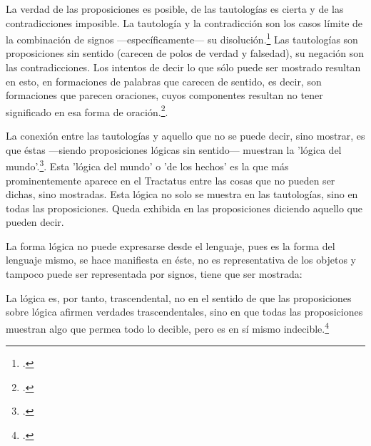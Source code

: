 
    La verdad de las proposiciones es posible, de las tautologías es cierta y de las
    contradicciones imposible. La tautología y la contradicción son los casos límite
    de la combinación de signos ---específicamente--- su
    disolución.\footcite[cf.~][4.464 y 4.466]{tractatus} Las tautologías son
    proposiciones sin sentido (carecen de polos de verdad y falsedad), su negación son
    las contradicciones. Los intentos de decir lo que sólo puede ser mostrado
    resultan en esto, en formaciones de palabras que carecen de sentido, es decir,
    son formaciones que parecen oraciones, cuyos componentes resultan no tener
    significado en esa forma de oración.\footcite[cf.~][p.~163~\S2]{IWT}.

La conexión entre las tautologías y aquello que no se puede decir, sino
mostrar, es que éstas ---siendo proposiciones lógicas sin sentido--- muestran
la 'lógica del mundo'.\footcite[cf.~][p.~163~\S3]{IWT}. Esta 'lógica del
mundo' o 'de los hechos' es la que más prominentemente aparece en el Tractatus
entre las cosas que no pueden ser dichas, sino mostradas. Esta lógica no solo
se muestra en las tautologías, sino en todas las proposiciones. Queda exhibida
en las proposiciones diciendo aquello que pueden decir.

La forma lógica no puede expresarse desde el lenguaje, pues es la forma del
lenguaje mismo, se hace manifiesta en éste, no es representativa de los objetos
y tampoco puede ser representada por signos, tiene que ser mostrada:

La lógica es, por tanto, trascendental, no en el sentido de que las
proposiciones sobre lógica afirmen verdades trascendentales, sino en que todas
las proposiciones muestran algo que permea todo lo decible, pero es en sí mismo
indecible.\footcite[cf.~][p.~166 \S2]{IWT}

